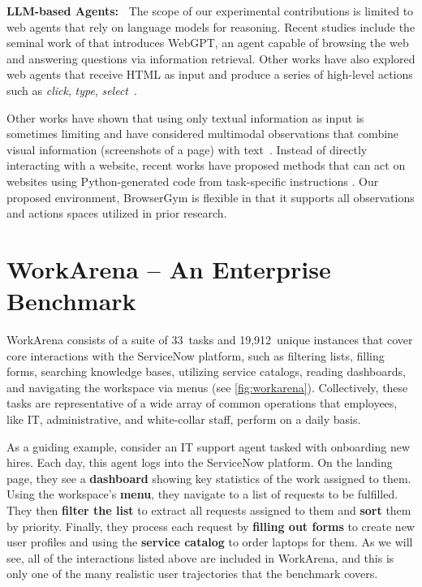 \documentclass{article}
\theoremstyle{plain}
\theoremstyle{definition}
\theoremstyle{remark}
\newcommand{\paragraphtight}[1]{\textbf{#1~}}
\newcommand{\wataskcount}{33}
\newcommand{\wainstancecount}{{19,912}}
\begin{document}
\paragraphtight{LLM-based Agents:} The scope of our experimental contributions is limited to web agents that rely on language models for reasoning.
Recent studies include the seminal work of \citet{nakano2021webgpt} that introduces WebGPT, an agent capable of browsing the web and answering questions via information retrieval.
Other works have also explored web agents that receive HTML as input and produce a series of high-level actions such as \emph{click}, \emph{type}, \emph{select}~\citep{deng2023mind2web, liu2023agentbench,liu2023bolaa,yao2023react}.

Other works have shown that using only textual information as input is sometimes limiting and have considered multimodal observations that combine visual information (screenshots of a page) with text~\citep{Humphreys22rl4MiniWoB, he2024webvoyager}.
Instead of directly interacting with a website, recent works have proposed methods that can act on websites using Python-generated code from task-specific instructions \citep{gur2023real,gur2023webagent}.
Our proposed environment, BrowserGym is flexible in that it supports all observations and actions spaces utilized in prior research.


\section{WorkArena -- An Enterprise Benchmark}\label{sec:workarena}

WorkArena consists of a suite of \wataskcount~tasks and \wainstancecount\ unique instances that cover core interactions with the ServiceNow platform, such as filtering lists, filling forms, searching knowledge bases, utilizing service catalogs, reading dashboards, and navigating the workspace via menus (see \cref{fig:workarena}). Collectively, these tasks are representative of a wide array of common operations that employees, like IT, administrative, and white-collar staff, perform on a daily basis.

As a guiding example, consider an IT support agent tasked with onboarding new hires. Each day, this agent logs into the ServiceNow platform. On the landing page, they see a \textbf{dashboard} showing key statistics of the work assigned to them. Using the workspace's \textbf{menu}, they navigate to a list of requests to be fulfilled. They then \textbf{filter the list} to extract all requests assigned to them and \textbf{sort} them by priority. Finally, they process each request by \textbf{filling out forms} to create new user profiles and using the \textbf{service catalog} to order laptops for them.
As we will see, all of the interactions listed above are included in WorkArena, and this is only one of the many realistic user trajectories that the benchmark covers.
\end{document}
